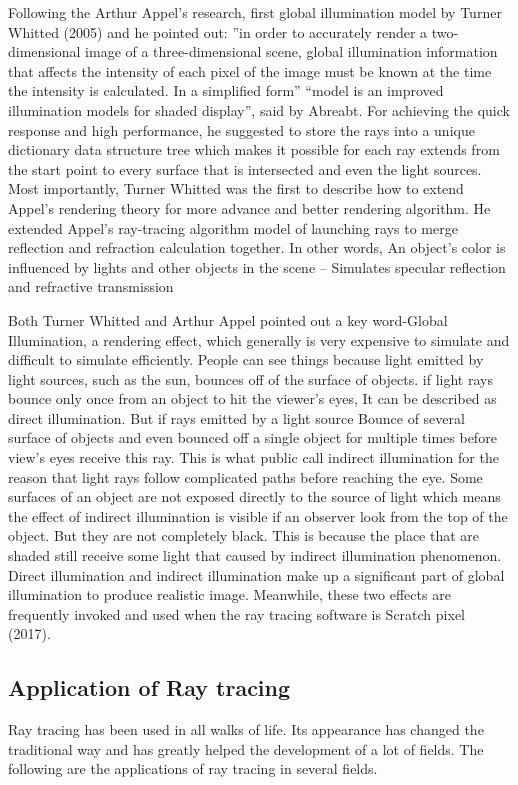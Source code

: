\documentclass[11pt]{article}
\begin{document}
Following the Arthur Appel’s research, first global illumination model by Turner Whitted (2005) and he pointed out: ”in order to accurately render a two-dimensional image of a three-dimensional scene, global illumination information that affects the intensity of each pixel of the image must be known at the time the intensity is calculated. In a simplified form”
“model is an improved illumination models for shaded display”, said by Abreabt. For achieving the quick response and high performance, he suggested to store the rays into a unique dictionary data structure tree which makes it possible for each ray extends from the start point to every surface that is intersected and even the light sources. Most importantly, Turner Whitted was the first to describe how to extend Appel’s rendering theory for more advance and better rendering algorithm. He extended Appel’s ray-tracing algorithm model of launching rays to merge reflection and refraction calculation together. In other words, An object’s color is influenced by lights and other objects in the scene – Simulates specular reflection and refractive transmission

Both Turner Whitted and Arthur Appel pointed out a key word-Global Illumination, a rendering effect, which generally is very expensive to simulate and difficult to simulate efficiently. People can see things because light emitted by light sources, such as the sun, bounces off of the surface of objects. if light rays bounce only once from an object to hit the viewer’s eyes, It can be described as direct illumination. But if rays emitted by a light source
Bounce of several surface of objects and even bounced off a single object for multiple times before view’s eyes receive this ray. This is what public call indirect illumination for the reason that light rays follow complicated paths before reaching the eye. Some surfaces of an object are not exposed directly to the source of light which means the effect of indirect illumination is visible if an observer look from the top of the object. But they are not completely black. This is because the place that are shaded still receive some light that caused by indirect illumination phenomenon. Direct illumination and indirect illumination make up a significant part of global illumination to produce realistic image. Meanwhile, these two effects are frequently invoked and used when the ray tracing software is Scratch pixel (2017).


\subsection{Application of Ray tracing}
Ray tracing has been used in all walks of life. Its appearance has changed the traditional way and has greatly helped the development of a lot of fields. The following are the applications of ray tracing in several fields.
\end{document}
